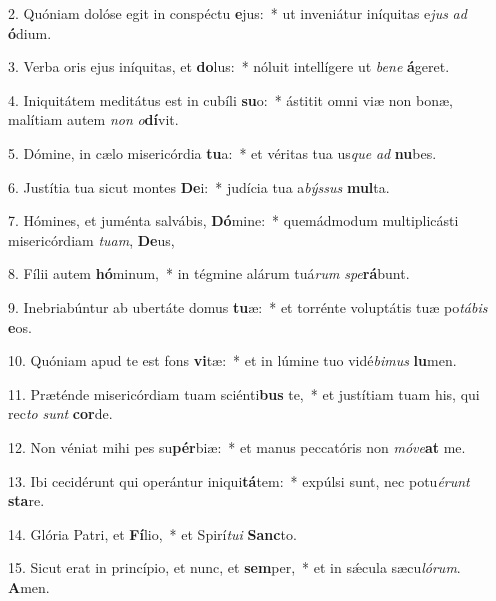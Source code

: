 2. Quóniam dolóse egit in conspéctu \textbf{e}jus:~*  ut inveniátur iníquitas e\textit{jus} \textit{ad} \textbf{ó}dium.\

3. Verba oris ejus iníquitas, et \textbf{do}lus:~*  nóluit intellígere ut \textit{be}\textit{ne} \textbf{á}geret.\

4. Iniquitátem meditátus est in cubíli \textbf{su}o:~*  ástitit omni viæ non bonæ, malítiam autem \textit{non} \textit{o}\textbf{dí}vit.\

5. Dómine, in cælo misericórdia \textbf{tu}a:~*  et véritas tua us\textit{que} \textit{ad} \textbf{nu}bes.\

6. Justítia tua sicut montes \textbf{De}i:~*  judícia tua a\textit{býs}\textit{sus} \textbf{mul}ta.\

7. Hómines, et juménta salvábis, \textbf{Dó}mine:~*  quemádmodum multiplicásti misericórdiam \textit{tu}\textit{am}, \textbf{De}us,\

8. Fílii autem \textbf{hó}minum,~*  in tégmine alárum tuá\textit{rum} \textit{spe}\textbf{rá}bunt.\

9. Inebriabúntur ab ubertáte domus \textbf{tu}æ:~*  et torrénte voluptátis tuæ po\textit{tá}\textit{bis} \textbf{e}os.\

10. Quóniam apud te est fons \textbf{vi}tæ:~*  et in lúmine tuo vidé\textit{bi}\textit{mus} \textbf{lu}men.\

11. Præténde misericórdiam tuam sciénti\textbf{bus} te,~*  et justítiam tuam his, qui rec\textit{to} \textit{sunt} \textbf{cor}de.\

12. Non véniat mihi pes su\textbf{pér}biæ:~*  et manus peccatóris non \textit{mó}\textit{ve}\textbf{at} me.\

13. Ibi cecidérunt qui operántur iniqui\textbf{tá}tem:~*  expúlsi sunt, nec potu\textit{é}\textit{runt} \textbf{sta}re.\

14. Glória Patri, et \textbf{Fí}lio,~*  et Spirí\textit{tu}\textit{i} \textbf{Sanc}to.\

15. Sicut erat in princípio, et nunc, et \textbf{sem}per,~*  et in sǽcula sæcu\textit{ló}\textit{rum}. \textbf{A}men.\

